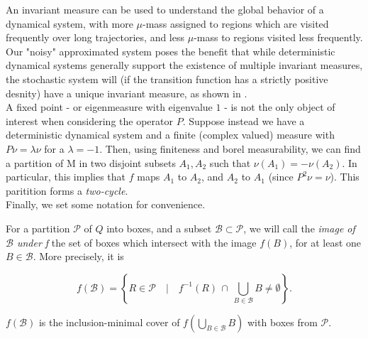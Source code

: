 An invariant measure can be used to understand the global behavior of a dynamical 
system, with more $\mu$-mass assigned to regions which are visited frequently over long
trajectories, and less $\mu$-mass to regions visited less frequently. \\

Our "noisy" approximated system poses the benefit that while deterministic dynamical systems 
generally support the existence of multiple invariant measures, the stochastic system will 
(if the transition function has a strictly positive desnity) have a unique invariant measure, 
as shown in \cite*{lasota}. \\

A fixed point - or eigenmeasure with eigenvalue $1$ - is not the only object of interest 
when considering the operator $P$. Suppose instead we have a deterministic dynamical system
and a finite (complex valued) measure with $P \nu = \lambda \nu$ for a $\lambda = -1$. Then, 
using finiteness and borel measurability, we can find a partition of M in two disjoint subsets 
$A_1, A_2$ such that $\nu (A_1) = - \nu (A_2)$. In particular, this implies that $f$ maps 
$A_1$ to $A_2$, and $A_2$ to $A_1$ (since $P^2 \nu = \nu$). This paritition forms a 
\emph{two-cycle}. \\

Finally, we set some notation for convenience.

\begin{definition}
    For a partition $\mathcal{P}$ of $Q$ into boxes, and a subset 
    $\mathcal{B} \subset \mathcal{P}$, we will call the \emph{image of $\mathcal{B}$ under f} 
    the set of boxes which intersect with the image $f(B)$, for at least one 
    $B \in \mathcal{B}$. More precisely, it is 
    
    \begin{equation}
        f (\mathcal{B}) = \left\{
            R \in \mathcal{P} \quad \vert \quad 
            f^{-1} (R)\, \cap\, \bigcup\limits_{B \in \mathcal{B}} B \neq \emptyset
        \right\}.
    \end{equation}

\end{definition}

\begin{theorem}
    $f(\mathcal{B})$ is the inclusion-minimal cover of $f(\bigcup_{B \in \mathcal{B}} B)$
    with boxes from $\mathcal{P}$.
\end{theorem}

